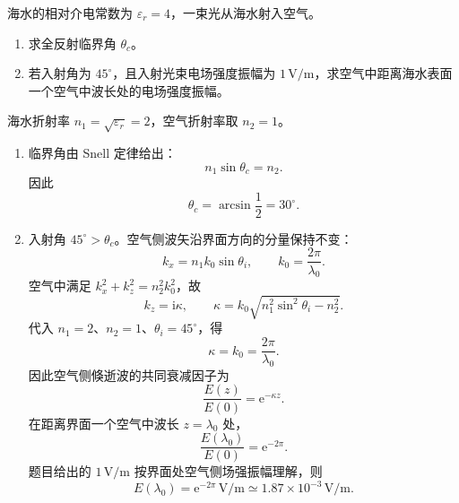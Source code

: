
\begin{question}[海水到空气的全反射与倏逝波]
海水的相对介电常数为 $\varepsilon_r=4$，一束光从海水射入空气。
\begin{enumerate}
  \item 求全反射临界角 $\theta_c$。
  \item 若入射角为 $45^\circ$，且入射光束电场强度振幅为 $1\,\mathrm{V/m}$，求空气中距离海水表面一个空气中波长处的电场强度振幅。
\end{enumerate}
\begin{solution}
海水折射率 $n_1=\sqrt{\varepsilon_r}=2$，空气折射率取 $n_2=1$。
\begin{enumerate}
  \item 临界角由 Snell 定律给出：
  \[
    n_1\sin\theta_c=n_2 .
  \]
  因此
  \[
    \boxed{\theta_c=\arcsin\frac{1}{2}=30^\circ} .
  \]

  \item 入射角 $45^\circ>\theta_c$。空气侧波矢沿界面方向的分量保持不变：
  \[
    k_x=n_1k_0\sin\theta_i,
    \qquad k_0=\frac{2\pi}{\lambda_0} .
  \]
  空气中满足 $k_x^2+k_z^2=n_2^2k_0^2$，故
  \[
    k_z=\mathrm i\kappa,
    \qquad
    \kappa=k_0\sqrt{n_1^2\sin^2\theta_i-n_2^2}.
  \]
  代入 $n_1=2$、$n_2=1$、$\theta_i=45^\circ$，得
  \[
    \kappa=k_0=\frac{2\pi}{\lambda_0} .
  \]
  因此空气侧倏逝波的共同衰减因子为
  \[
    \frac{E(z)}{E(0)}=\mathrm e^{-\kappa z} .
  \]
  在距离界面一个空气中波长 $z=\lambda_0$ 处，
  \[
    \boxed{\frac{E(\lambda_0)}{E(0)}=\mathrm e^{-2\pi}} .
  \]
  题目给出的 $1\,\mathrm{V/m}$ 按界面处空气侧场强振幅理解，则
  \[
    \boxed{E(\lambda_0)=\mathrm e^{-2\pi}\,\mathrm{V/m}
    \simeq1.87\times10^{-3}\,\mathrm{V/m}} .
  \]
\end{enumerate}
\end{solution}
\end{question}

